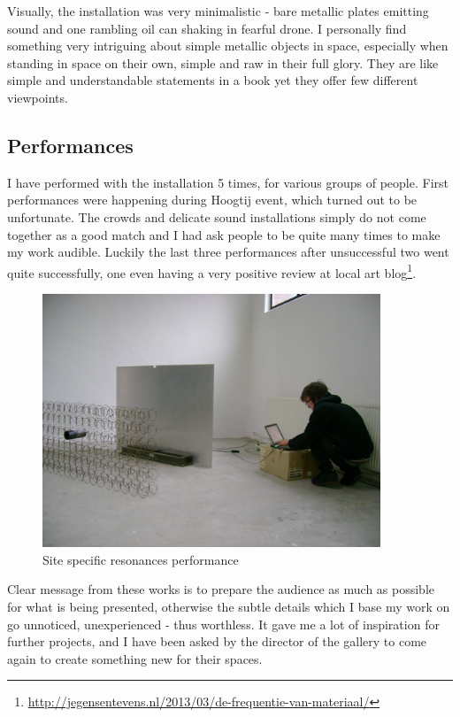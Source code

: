 \documentclass[12pt,a4paper,oneside]{report}
\begin{document}
Visually, the installation was very minimalistic - bare metallic plates emitting sound and one rambling oil can shaking in fearful drone. I personally find something very intriguing about simple metallic objects in space, especially when standing in space on their own, simple and raw in their full glory. They are like simple and understandable statements in a book yet they offer few different viewpoints.

\subsection{Performances}

I have performed with the installation 5 times, for various groups of people. First performances were happening during Hoogtij event, which turned out to be unfortunate. The crowds and delicate sound installations simply do not come together as a good match and I had ask people to be quite many times to make my work audible. Luckily the last three performances after unsuccessful two went quite successfully, one even having a very positive review at local art blog\footnote{\url{http://jegensentevens.nl/2013/03/de-frequentie-van-materiaal/}}.

\begin{figure}  
  \centering
    \includegraphics[width=0.9\textwidth]{img/sitespec}
	\caption{Site specific resonances performance}
	\label{fig:sitespec}
\end{figure}

Clear message from these works is to prepare the audience as much as possible for what is being presented, otherwise the subtle details which I base my work on go unnoticed, unexperienced - thus worthless. It gave me a lot of inspiration for further projects, and I have been asked by the director of the gallery to come again to create something new for their spaces.
\end{document}
